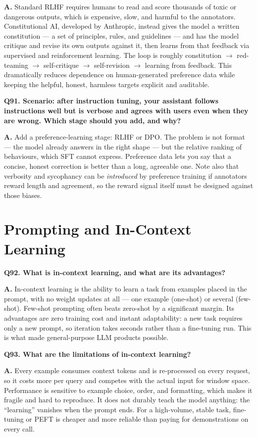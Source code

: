\documentclass[11pt]{article}
\begin{document}
\noindent\textbf{A.} Standard RLHF requires humans to read and score thousands of toxic or dangerous outputs, which is expensive, slow, and harmful to the annotators. Constitutional AI, developed by Anthropic, instead gives the model a written constitution --- a set of principles, rules, and guidelines --- and has the model critique and revise its own outputs against it, then learns from that feedback via supervised and reinforcement learning. The loop is roughly constitution $\rightarrow$ red-teaming $\rightarrow$ self-critique $\rightarrow$ self-revision $\rightarrow$ learning from feedback. This dramatically reduces dependence on human-generated preference data while keeping the helpful, honest, harmless targets explicit and auditable.

\medskip
\noindent\textbf{Q91. Scenario: after instruction tuning, your assistant follows instructions well but is verbose and agrees with users even when they are wrong. Which stage should you add, and why?}

\noindent\textbf{A.} Add a preference-learning stage: RLHF or DPO. The problem is not format --- the model already answers in the right shape --- but the relative ranking of behaviours, which SFT cannot express. Preference data lets you say that a concise, honest correction is better than a long, agreeable one. Note also that verbosity and sycophancy can be \emph{introduced} by preference training if annotators reward length and agreement, so the reward signal itself must be designed against those biases.

\section{Prompting and In-Context Learning}

\noindent\textbf{Q92. What is in-context learning, and what are its advantages?}

\noindent\textbf{A.} In-context learning is the ability to learn a task from examples placed in the prompt, with no weight updates at all --- one example (one-shot) or several (few-shot). Few-shot prompting often beats zero-shot by a significant margin. Its advantages are zero training cost and instant adaptability: a new task requires only a new prompt, so iteration takes seconds rather than a fine-tuning run. This is what made general-purpose LLM products possible.

\medskip
\noindent\textbf{Q93. What are the limitations of in-context learning?}

\noindent\textbf{A.} Every example consumes context tokens and is re-processed on every request, so it costs more per query and competes with the actual input for window space. Performance is sensitive to example choice, order, and formatting, which makes it fragile and hard to reproduce. It does not durably teach the model anything: the ``learning'' vanishes when the prompt ends. For a high-volume, stable task, fine-tuning or PEFT is cheaper and more reliable than paying for demonstrations on every call.
\end{document}
